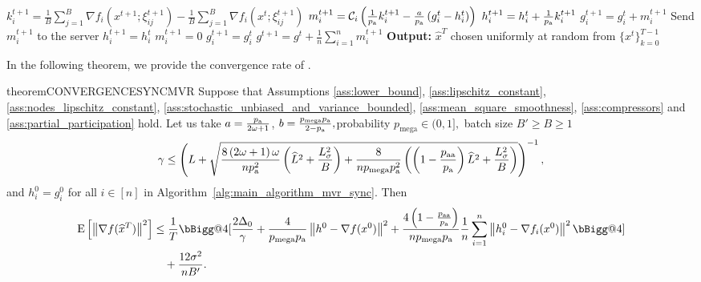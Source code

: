\documentclass{article}
\makeatletter
\newcommand{\algorithmname}{DASHA-PP}
\newcommand*{\probavailable}{\ensuremath{p_{\textnormal{a}}}}
\newcommand*{\probpairaa}{\ensuremath{p_{\textnormal{aa}}}}
\newcommand*{\probmega}{\ensuremath{p_{\text{mega}}}}
\newcommand{\vast}{\bBigg@{4}}
\makeatother
\begin{document}
\begin{algorithm}[h]
\begin{algorithmic}[1]
              \STATE $k^{t+1}_i = \frac{1}{B} \sum_{j=1}^{B}\nabla f_i(x^{t+1};\xi^{t+1}_{ij}) - \frac{1}{B} \sum_{j=1}^{B}\nabla f_i(x^{t};\xi^{t+1}_{ij})$
              \STATE $m^{t+1}_i = \cC_i\left(\frac{1}{\probavailable}k^{t+1}_i - \frac{a}{\probavailable} \left(g^t_i - h^{t}_i\right)\right)$ 
          \ENDIF
          \STATE $h^{t+1}_i = h^t_i + \frac{1}{\probavailable}k^{t+1}_i$ 
          \STATE $g^{t+1}_i = g^t_i + m^{t+1}_i$
          \STATE Send $m^{t+1}_i$ to the server
      \ELSE
          \STATE $h^{t+1}_i = h^{t}_i$
          \STATE $m^{t+1}_i = 0$
          \STATE $g^{t+1}_i = g^{t}_i$
      \ENDIF
      \ENDFOR
      \STATE $g^{t+1} = g^t + \frac{1}{n} \sum_{i=1}^{n} m^{t+1}_i$
      \ENDFOR
      \STATE \textbf{Output:} $\hat{x}^T$ chosen uniformly at random from $\{x^t\}_{k=0}^{T-1}$
      \end{algorithmic}
  \end{algorithm}

  In the following theorem, we provide the convergence rate of \algname{\algorithmname-SYNC-MVR}.

  \begin{restatable}{theorem}{CONVERGENCESYNCMVR}
    \label{theorem:sync_stochastic}
    Suppose that Assumptions \ref{ass:lower_bound}, \ref{ass:lipschitz_constant}, \ref{ass:nodes_lipschitz_constant}, \ref{ass:stochastic_unbiased_and_variance_bounded}, \ref{ass:mean_square_smoothness}, \ref{ass:compressors} and \ref{ass:partial_participation} hold. Let us take $a = \frac{\probavailable}{2\omega + 1}$, $b = \frac{\probmega \probavailable}{2 - \probavailable},$probability $\probmega \in (0, 1],$ batch size $B' \geq B \geq 1$ $$\gamma \leq \left(L + \sqrt{\frac{8 \left(2\omega + 1\right) \omega}{n \probavailable^2}\left(\widehat{L}^2 + \frac{L_{\sigma}^2}{B}\right) + \frac{8}{n \probmega \probavailable^2} \left(\left(1 - \frac{\probpairaa}{\probavailable}\right) \widehat{L}^2 + \frac{L_{\sigma}^2}{B}\right)}\right)^{-1},$$ and $h^{0}_i = g^{0}_i$ for all $i \in [n]$
    in Algorithm~\ref{alg:main_algorithm_mvr_sync}. Then 
    \begin{align*}
      \Exp{\norm{\nabla f(\widehat{x}^T)}^2} &\leq \frac{1}{T}\vast[\frac{2 \Delta_0}{\gamma} + \frac{4}{\probmega \probavailable} \norm{h^{0} - \nabla f(x^{0})}^2 + \frac{4 \left(1 - \frac{\probpairaa}{\probavailable}\right)}{n \probmega \probavailable}\frac{1}{n}\sum_{i=1}^n\norm{h^{0}_i - \nabla f_i(x^{0})}^2 \vast] \\
      &\quad + \frac{12 \sigma^2}{n B'}.
    \end{align*}
  \end{restatable}
\end{document}
